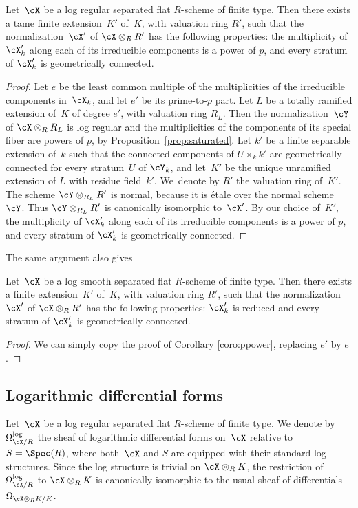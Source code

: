 \begin{cor}\label{coro:ppower}
Let~$\cX$ be a log regular separated flat $R$\nobreakdash-scheme of finite type.
Then there exists a tame finite extension~$K'$ of~$K$, with valuation ring $R'$, such that
the normalization~$\cX'$ of $\cX\otimes_R R'$ has the following properties: the multiplicity of $\cX'_k$ along each of its
irreducible components is a power of $p$, and every stratum of $\cX'_k$ is geometrically connected.
\end{cor}
\begin{proof}
Let $e$ be the least common multiple of the multiplicities of the irreducible components in~$\cX_k$, and let $e'$ be its prime-to-$p$ part. Let $L$ be a totally ramified extension of~$K$ of degree $e'$, with valuation ring $R_L$. Then the normalization~$\cY$ of $\cX\otimes_R R_L$ is log regular and the multiplicities of the components of its special fiber are powers of $p$, by Proposition~\ref{prop:saturated}. Let $k'$ be a finite separable extension of~$k$ such that the connected components of $U\times_k k'$ are geometrically connected for every stratum~$U$ of $\cY_k$, and let~$K'$ be the unique unramified extension of $L$ with residue field~$k'$. We~denote by $R'$ the valuation ring of~$K'$. The scheme $\cY\otimes_{R_L} R'$ is normal, because it is étale over the normal scheme~$\cY$. Thus $\cY\otimes_{R_L} R'$ is canonically isomorphic to~$\cX'$. By our choice of~$K'$, the multiplicity of $\cX'_k$ along each of its irreducible components is a power of $p$, and every stratum of $\cX'_k$ is geometrically connected.
\end{proof}
The same argument also gives
\begin{cor}\label{coro:reduced}
Let~$\cX$ be a log smooth separated flat $R$\nobreakdash-scheme of finite type.
Then there exists a finite extension~$K'$ of~$K$, with valuation ring $R'$, such that
the normalization~$\cX'$ of $\cX\otimes_R R'$ has the following properties: $\cX'_k$ is reduced and every stratum of $\cX'_k$ is geometrically connected.
\end{cor}
\begin{proof}
We can simply copy the proof of Corollary \ref{coro:ppower}, replacing $e'$ by $e$.
\end{proof}

\subsection{Logarithmic differential forms}\label{ss:logdiff}
Let~$\cX$ be a log regular separated flat $R$\nobreakdash-scheme of finite type.
We denote by $\Omega^{\log}_{\cX/R}$ the sheaf of logarithmic differential forms on~$\cX$ relative to $S=\Spec(R)$, where both~$\cX$ and $S$ are equipped with their standard log structures. Since the log structure is trivial on $\cX\otimes_R K$, the restriction of $\Omega^{\log}_{\cX/R}$ to $\cX\otimes_R K$ is canonically isomorphic to the usual sheaf of differentials $\Omega_{\cX\otimes_R K/K}$.

